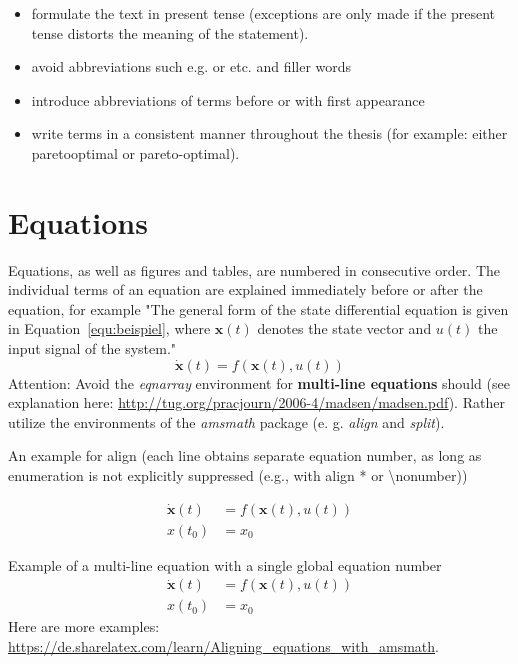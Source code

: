 \begin{itemize}
  \item formulate the text in present tense (exceptions are only made if the present tense distorts the meaning of the statement).
  \item avoid abbreviations such e.g. or etc. and filler words 
    \item introduce abbreviations of terms before or with first appearance
  \item write terms in a consistent manner throughout the thesis (for example: either paretooptimal or pareto-optimal).
\end{itemize}


\section{Equations}
\label{hinweise:gleichungen}
%
Equations, as well as figures and tables, are numbered in consecutive order.
The individual terms of an equation are explained immediately before or after the equation, for example "The general form of the state differential equation is given in Equation~\ref{equ:beispiel}, where $\mathbf{x}(t)$ denotes the state vector and $u(t)$ the input signal of the system." %
%
\begin{equation}
  \dot{\mathbf{x}}(t) = f(\mathbf{x}(t), u(t))
  \label{equ:beispiel}
\end{equation}
%
Attention: Avoid the \textit{eqnarray} environment for \textbf{multi-line equations}  should (see explanation here: \url{http://tug.org/pracjourn/2006-4/madsen/madsen.pdf}).
Rather utilize the environments of the \textit{amsmath} package (e. g. \textit{align} and \textit{split}).

An example for align (each line obtains separate  equation number, as long as enumeration is not explicitly suppressed (e.g., with align * or \textbackslash nonumber))

\begin{align}
    \dot{\mathbf{x}}(t) &= f(\mathbf{x}(t), u(t)) \\
    x(t_0) &= x_0
\end{align}

Example of a multi-line equation with a single global equation number
\begin{equation}
\begin{split}
    \dot{\mathbf{x}}(t) &= f(\mathbf{x}(t), u(t)) \\
    x(t_0) &= x_0
\end{split}
\end{equation}
Here are more examples: \sloppy\url{https://de.sharelatex.com/learn/Aligning_equations_with_amsmath}.


